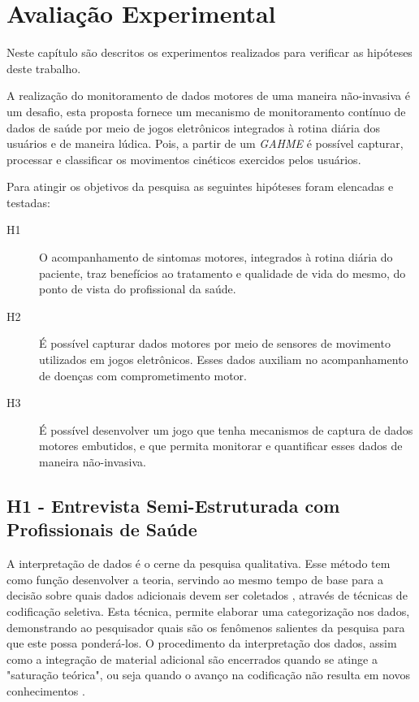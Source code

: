 \chapter{Avalia\c{c}\~{a}o Experimental} \label{chap:avaliacao}
Neste capítulo são descritos os experimentos realizados para verificar as hipóteses deste trabalho.

A realização do monitoramento de dados motores de uma maneira não-invasiva é um desafio, esta proposta fornece um mecanismo de monitoramento contínuo de dados de saúde por meio de jogos eletrônicos integrados à rotina diária dos usuários e de maneira lúdica. Pois, a partir de um \textit{GAHME} é possível capturar, processar e classificar os movimentos cinéticos exercidos pelos usuários.

Para atingir os objetivos da pesquisa as seguintes hipóteses foram elencadas e testadas:
	\begin{description}
	\item[H1] O acompanhamento de sintomas motores, integrados à rotina diária do paciente, traz benefícios ao tratamento e qualidade de vida do mesmo, do ponto de vista do profissional da saúde.
	\item[H2] É possível capturar dados motores por meio de sensores de movimento utilizados em jogos eletrônicos. Esses dados auxiliam no acompanhamento de doenças com comprometimento motor.
	\item[H3] É possível desenvolver um jogo que tenha mecanismos de captura de dados motores embutidos, e que permita monitorar e quantificar esses dados de maneira não-invasiva.
	\end{description}


\section{H1 - Entrevista Semi-Estruturada com Profissionais de Saúde}\label{chapter:entrevista_semi_estruturada}

A interpretação de dados é o cerne da pesquisa qualitativa. Esse método tem como função desenvolver a teoria, servindo ao mesmo tempo de base para a decisão sobre quais dados adicionais devem ser coletados \cite{FLI04}, através de técnicas de codificação seletiva. Esta técnica, permite elaborar uma categorização nos dados, demonstrando ao pesquisador quais são os fenômenos salientes da pesquisa para que este possa ponderá-los. O procedimento da interpretação dos dados, assim como a integração de material adicional são encerrados quando se atinge a "saturação teórica", ou seja quando o avanço na codificação não resulta em novos conhecimentos \cite{FLI04}.

